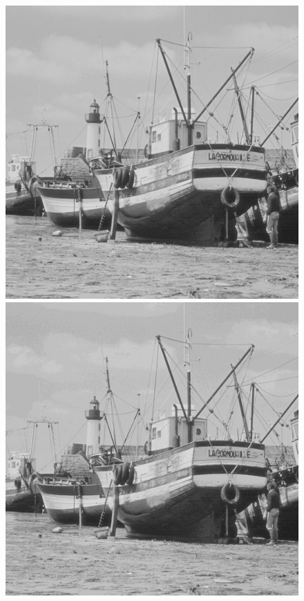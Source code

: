 \documentclass[12pt]{report}
\begin{document}
\begin{figure}[H]
\begin{center}
\includegraphics[scale=0.25]{../ImageRes/ImagedecodeeMICDAQ2.jpg} 
\includegraphics[scale=0.25]{../ImageRes/ImagedecodeeMICDAQ8.jpg} 

\end{center}
\end{figure}
\end{document}
